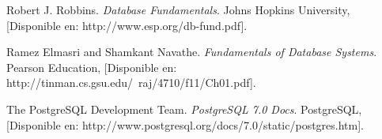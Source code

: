 \documentclass[spanish,12pt,letterpapper]{article}
\begin{document}
	
	\pagebreak
	\begin{thebibliography}{9}
		 Robert J. Robbins. 
		\emph{Database Fundamentals}. Johns Hopkins University, [Disponible en: http://www.esp.org/db-fund.pdf].
		
		 Ramez Elmasri and Shamkant Navathe. 
		\emph{Fundamentals of Database Systems}. Pearson Education, [Disponible en: http://tinman.cs.gsu.edu/~raj/4710/f11/Ch01.pdf].
		
		 The PostgreSQL Development Team. 
		\emph{PostgreSQL 7.0 Docs}. PostgreSQL, [Disponible en: http://www.postgresql.org/docs/7.0/static/postgres.htm].
		

	\end{thebibliography}
\end{document}
